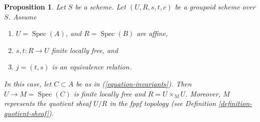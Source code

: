 \documentclass{amsart}
\theoremstyle{plain}
\newtheorem{proposition}[subsection]{Proposition}
\theoremstyle{definition}
\theoremstyle{remark}
\numberwithin{equation}{subsection}
\def\Spec{\mathop{\mathrm{Spec}}}
\begin{document}
\begin{proposition}
\label{proposition-finite-flat-equivalence}
Let $S$ be a scheme.
Let $(U, R, s, t, c)$ be a groupoid scheme over $S$.
Assume
\begin{enumerate}
\item $U = \Spec(A)$, and $R = \Spec(B)$ are affine,
\item $s, t : R \to U$ finite locally free, and
\item $j = (t, s)$ is an equivalence relation.
\end{enumerate}
In this case, let $C \subset A$ be as in
(\ref{equation-invariants}). Then $U \to M = \Spec(C)$
is finite locally free and $R = U \times_M U$.
Moreover, $M$ represents the quotient sheaf $U/R$
in the fppf topology (see Definition \ref{definition-quotient-sheaf}).
\end{proposition}
\end{document}
